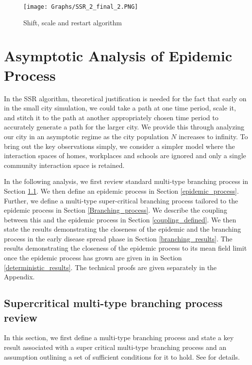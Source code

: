 \documentclass{article}
\theoremstyle{definition}
\begin{document}
  \begin{figure}
      \centering
  \texttt{[image: Graphs/SSR\_2\_final\_2.PNG]}
    \caption{ Shift, scale and restart algorithm} 
    \label{SSR_2_final_1}
  \end{figure}
  
 

 

 
 
 





  

 
 
\section{Asymptotic Analysis of Epidemic Process} 
\label{Theoretical_results}

In the SSR algorithm, theoretical justification is needed for the fact that early on in the small city simulation, we could take a path at one time period, scale it, and stitch it to the path at another appropriately chosen time period to accurately 
generate a path for the larger city.   We provide this through analyzing our city in an asymptotic regime as the city population
$N$ increases to infinity. To bring out the key observations simply, we consider a simpler model where the interaction spaces of homes, workplaces and schools are ignored and only a single community interaction space is retained.

 In the following analysis, we first review standard multi-type branching process in Section \ref{define_standard_MTBP}. We then define an epidemic process in Section \ref{epidemic_process}. Further, we define a multi-type super-critical branching process tailored to the epidemic process in Section \ref{Branching_process}. We describe the coupling between this and the epidemic process in Section \ref{coupling_defined}.  We then state the results demonstrating
 the closeness of the epidemic and the branching process in the early disease spread phase  in Section \ref{branching_results}. The results demonstrating the closeness
 of the epidemic process to its mean field limit once the epidemic process has grown are given in  in Section \ref{deterministic_results}.
The technical proofs are given separately in the Appendix. 


\subsection{Supercritical multi-type branching process review}
\label{define_standard_MTBP}
  In this section, we first define a multi-type branching process and state a key result associated with a super critical 
  multi-type branching process and an assumption outlining a set of sufficient conditions for it to hold.
  See \cite{branching_process_notes} for details.
\end{document}
